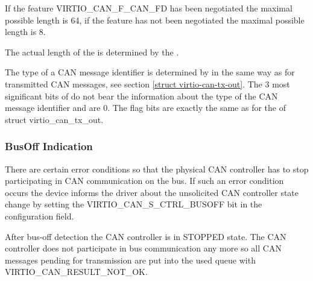 If the feature VIRTIO_CAN_F_CAN_FD has been negotiated the maximal
possible  length is 64, if the feature has not been
negotiated the maximal possible  length is 8.

The actual length of the  is determined by the .

The type of a CAN message identifier is determined by  in
the same way as for transmitted CAN messages, see section
\ref{struct virtio-can-tx-out}. The 3 most significant bits of  do not
bear the information about the type of the CAN message identifier and
are 0. The flag bits are exactly the same as for the  of
struct virtio_can_tx_out.

\subsubsection{BusOff Indication}\label{sec:Device Types / CAN Device / Device Operation / BusOff Indication}

There are certain error conditions so that the physical CAN controller
has to stop participating in CAN communication on the bus. If such an
error condition occurs the device informs the driver about the
unsolicited CAN controller state change by setting the
VIRTIO_CAN_S_CTRL_BUSOFF bit in the configuration  field.

After bus-off detection the CAN controller is in STOPPED state. The CAN
controller does not participate in bus communication any more so all CAN
messages pending for transmission are put into the used queue with
 VIRTIO_CAN_RESULT_NOT_OK.
